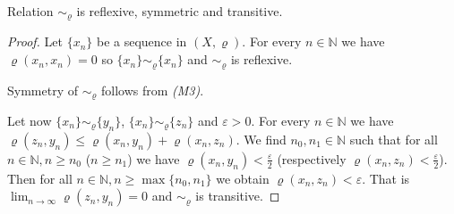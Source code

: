 \begin{theorem}\label{th:adjquiv}
Relation $\sim_\varrho$ is reflexive, symmetric and transitive.
\end{theorem}
\begin{proof}
Let $\{x_n\}$ be a sequence in $(X,\varrho)$. For every $n\in \mathbb{N}$ we have $\varrho(x_n,x_n)=0$ so $\{x_n\} \sim_\varrho \{x_n\}$ and $\sim_\varrho$ is reflexive.

Symmetry of $\sim_\varrho$ follows from \emph{(M3)}.

Let now $\{x_n\} \sim_\varrho \{y_n\}$, $\{x_n\} \sim_\varrho \{z_n\}$ and $\varepsilon>0$. For every $n\in \mathbb{N}$ we have $\varrho(z_n,y_n)\le\varrho(x_n,y_n)+\varrho(x_n,z_n)$. We find $n_0,n_1\in \mathbb{N}$ such that for all $n\in \mathbb{N}, n\ge n_0$ ($n\ge n_1$) we have $\varrho(x_n,y_n)<\frac{\varepsilon}{2}$ (respectively $\varrho(x_n,z_n)<\frac{\varepsilon}{2}$). Then for all $n\in \mathbb{N}, n\ge \max\{n_0,n_1\}$ we obtain $\varrho(x_n,z_n)<\varepsilon$. That is $\lim_{n\to\infty} \varrho(z_n,y_n)=0$ and $\sim_\varrho$ is transitive.
\end{proof}
























